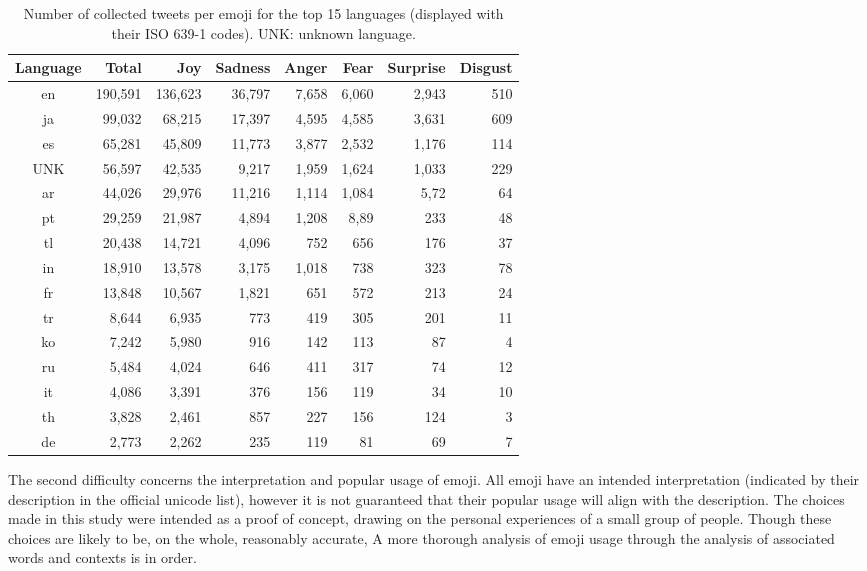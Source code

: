 \documentclass[10pt, a4paper]{article}
\begin{document}
\begin{table*}[!ht]
\centering
	\begin{tabular}{c | r | r | r | r | r | r | r}
\textbf{Language} & \textbf{Total} & \textbf{Joy} & \textbf{Sadness} & \textbf{Anger} & \textbf{Fear} & \textbf{Surprise} & \textbf{Disgust}  \\\hline
en  & 190,591 & 136,623 & 36,797 & 7,658 & 6,060 & 2,943 & 510 \\
ja  & 99,032 & 68,215 & 17,397 & 4,595 & 4,585 & 3,631 & 609 \\
es  & 65,281 & 45,809 & 11,773 & 3,877 & 2,532 & 1,176 & 114 \\
UNK  & 56,597 & 42,535 & 9,217 & 1,959 & 1,624 & 1,033 & 229\\
ar  & 44,026 & 29,976 & 11,216 & 1,114 & 1,084 & 5,72 & 64 \\
pt  & 29,259 & 21,987 & 4,894 & 1,208 & 8,89 & 233 & 48 \\
tl  & 20,438 & 14,721 & 4,096 & 752 & 656 & 176 & 37 \\
in  & 18,910 & 13,578 & 3,175 & 1,018 & 738 & 323 & 78 \\
fr  & 13,848 & 10,567 & 1,821 & 651 & 572 & 213 & 24\\
tr  & 8,644 & 6,935 & 773 & 419 & 305 & 201 & 11\\
ko  & 7,242 & 5,980 & 916 & 142 & 113 & 87 & 4\\
ru  & 5,484 & 4,024 & 646 & 411 & 317 & 74 & 12\\
it  & 4,086 & 3,391 & 376 & 156 & 119 & 34 & 10 \\
th  & 3,828 & 2,461 & 857 & 227 & 156 & 124 & 3\\
de  & 2,773 & 2,262 & 235 & 119 & 81 & 69 & 7
\end{tabular}
	\caption{Number of collected tweets per emoji for the top 15 languages (displayed with their ISO 639-1 codes). UNK: unknown language.}
	\label{tbl:top-ten-langs}
\end{table*}

The second difficulty concerns the interpretation and popular usage of emoji. 
All emoji have an intended interpretation (indicated by their description in the official unicode list), however it is not guaranteed that their popular usage will align with the description. 
The choices made in this study were intended as a proof of concept, drawing on the personal experiences of a small group of people. 
Though these choices are likely to be, on the whole, reasonably accurate, 
A more thorough analysis of 
emoji usage through the analysis of associated words and contexts is in order. 
\end{document}
